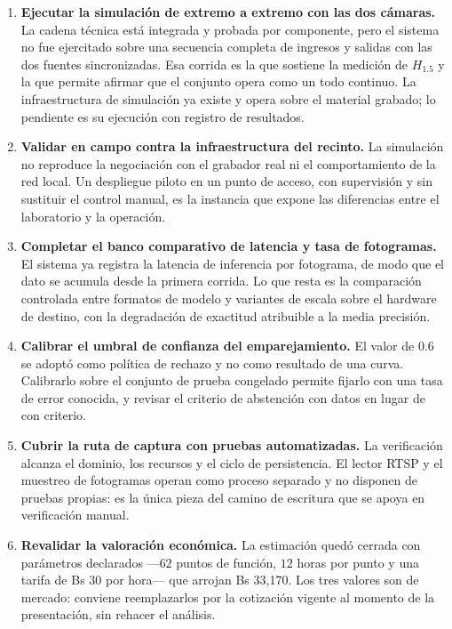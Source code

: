 \begin{enumerate}
    \item \textbf{Ejecutar la simulación de extremo a extremo con las dos
        cámaras.} La cadena técnica está integrada y probada por componente, pero
        el sistema no fue ejercitado sobre una secuencia completa de ingresos y
        salidas con las dos fuentes sincronizadas. Esa corrida es la que sostiene
        la medición de $H_{1{.}5}$ y la que permite afirmar que el conjunto opera
        como un todo continuo. La infraestructura de simulación ya existe y opera
        sobre el material grabado; lo pendiente es su ejecución con registro de
        resultados.

    \item \textbf{Validar en campo contra la infraestructura del recinto.} La
        simulación no reproduce la negociación con el grabador real ni el
        comportamiento de la red local. Un despliegue piloto en un punto de
        acceso, con supervisión y sin sustituir el control manual, es la
        instancia que expone las diferencias entre el laboratorio y la operación.

    \item \textbf{Completar el banco comparativo de latencia y tasa de
        fotogramas.} El sistema ya registra la latencia de inferencia por
        fotograma, de modo que el dato se acumula desde la primera corrida. Lo
        que resta es la comparación controlada entre formatos de modelo y
        variantes de escala sobre el hardware de destino, con la degradación de
        exactitud atribuible a la media precisión.

    \item \textbf{Calibrar el umbral de confianza del emparejamiento.} El valor
        de $0{.}6$ se adoptó como política de rechazo y no como resultado de una
        curva. Calibrarlo sobre el conjunto de prueba congelado permite fijarlo
        con una tasa de error conocida, y revisar el criterio de abstención con
        datos en lugar de con criterio.

    \item \textbf{Cubrir la ruta de captura con pruebas automatizadas.} La
        verificación alcanza el dominio, los recursos y el ciclo de persistencia.
        El lector RTSP y el muestreo de fotogramas operan como proceso separado y
        no disponen de pruebas propias: es la única pieza del camino de escritura
        que se apoya en verificación manual.

    \item \textbf{Revalidar la valoración económica.} La estimación quedó cerrada
        con parámetros declarados ---$62$ puntos de función, $12$ horas por punto
        y una tarifa de Bs $30$ por hora--- que arrojan Bs 33,170. Los tres
        valores son de mercado: conviene reemplazarlos por la cotización vigente
        al momento de la presentación, sin rehacer el análisis.
\end{enumerate}

